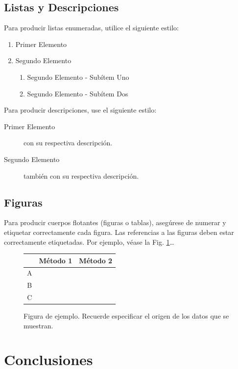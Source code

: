 \documentclass[12pt]{amsart}
\begin{document}
	\subsection{Listas y Descripciones}\label{sub:lists}
		Para producir listas enumeradas, utilice el siguiente estilo:
		\begin{enumerate}
			\item Primer Elemento
			\item Segundo Elemento
			\begin {enumerate}
				\item {Segundo Elemento - Subítem Uno}
				\item {Segundo Elemento - Subítem Dos}
			\end {enumerate}
		\end{enumerate}

		Para producir descripciones, use el siguiente estilo:

		\begin{description}
			\item [Primer Elemento] con su respectiva descripción.
			\item [Segundo Elemento] también con su respectiva descripción.
		\end{description}

	\subsection{Figuras}\label{sub:figures}
		Para producir cuerpos flotantes (figuras o tablas), asegúrese de numerar
		y etiquetar correctamente cada figura. Las referencias a las figuras deben
		estar correctamente etiquetadas. Por ejemplo, véase la Fig. \ref{fig:ex}\ldots

		\begin{figure}[h!]%
		\begin{center}
			\begin{tabular}{|c|c|c|} \hline
			 			& Método 1 	& Método 2 	\\ \hline
			A 			&  			&  			\\ \hline
			B			& 			& 			\\ \hline
			C 			& 			&  			\\ \hline
			\end{tabular}
		\caption{Figura de ejemplo. Recuerde especificar el origen de los datos que se muestran. \label{fig:ex}}
		\end{center}
		\end{figure}

\section{Conclusiones}
\end{document}
